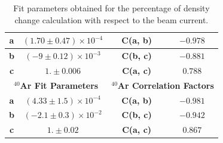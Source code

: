 \documentclass[review,numbers,sort&compress]{elsarticle}
\begin{document}
\begin{table}[!h]
\begin{tabular}{|c|c|l|c|c|l|}
\textbf{a}              & \multicolumn{2}{c|}{$(1.70 \pm 0.47) \times 10^{-4}$ }               & \textbf{C(a, b)}             & \multicolumn{2}{c|}{$-0.978$} \\ \hline
\textbf{b}              & \multicolumn{2}{c|}{$(-9 \pm 0.12) \times 10^{-3}$   }                & \textbf{C(b, c)}             & \multicolumn{2}{c|}{$-0.881$} \\ \hline
\textbf{c}              & \multicolumn{2}{c|}{$1. \pm 0.006$}                        & \textbf{C(a, c)}             & \multicolumn{2}{c|}{$0.788$}  \\ \hline
\multicolumn{3}{|c|}{\textbf{$^{40}$Ar Fit Parameters}}                              & \multicolumn{3}{c|}{\textbf{$^{40}$Ar Correlation Factors}}  \\ \hline
\textbf{a}              & \multicolumn{2}{c|}{$(4.33 \pm 1.5) \times 10^{-4}$}               & \textbf{C(a, b)}             & \multicolumn{2}{c|}{$-0.981$} \\ \hline
\textbf{b}              & \multicolumn{2}{c|}{$(-2.1 \pm 0.3) \times 10^{-2}$}                    & \textbf{C(b, c)}             & \multicolumn{2}{c|}{$-0.942$} \\ \hline
\textbf{c}              & \multicolumn{2}{c|}{$1. \pm 0.02$}                         & \textbf{C(a, c)}             & \multicolumn{2}{c|}{$0.867$}  \\ \hline
\end{tabular}
\caption{Fit parameters obtained for the percentage of density change calculation with respect to the beam current.}
\label{tab:fit_parameters}
\end{table}
\end{document}

